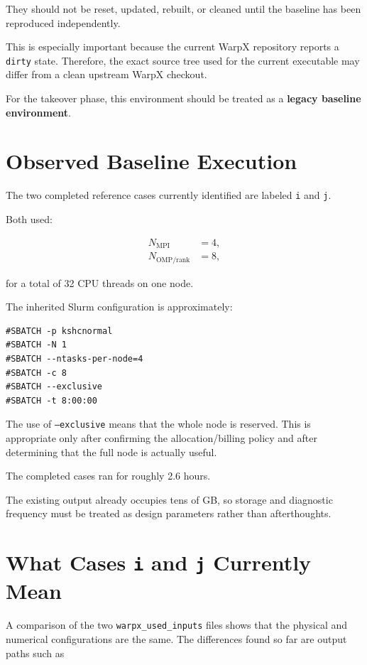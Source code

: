 \documentclass[11pt,a4paper]{article}
\begin{document}
They should not be reset, updated, rebuilt, or cleaned until the baseline has been reproduced independently.

This is especially important because the current WarpX repository reports a \texttt{dirty} state. Therefore, the exact source tree used for the current executable may differ from a clean upstream WarpX checkout.

For the takeover phase, this environment should be treated as a \textbf{legacy baseline environment}.

\section{Observed Baseline Execution}

The two completed reference cases currently identified are labeled \texttt{i} and \texttt{j}.

Both used:

\begin{align*}
N_{\mathrm{MPI}} &= 4,\\
N_{\mathrm{OMP/rank}} &= 8,
\end{align*}

for a total of 32 CPU threads on one node.

The inherited Slurm configuration is approximately:

\begin{lstlisting}
#SBATCH -p kshcnormal
#SBATCH -N 1
#SBATCH --ntasks-per-node=4
#SBATCH -c 8
#SBATCH --exclusive
#SBATCH -t 8:00:00
\end{lstlisting}

The use of \texttt{--exclusive} means that the whole node is reserved. This is appropriate only after confirming the allocation/billing policy and after determining that the full node is actually useful.

The completed cases ran for roughly 2.6 hours.

The existing output already occupies tens of GB, so storage and diagnostic frequency must be treated as design parameters rather than afterthoughts.

\section{What Cases \texttt{i} and \texttt{j} Currently Mean}

A comparison of the two \texttt{warpx\_used\_inputs} files shows that the physical and numerical configurations are the same. The differences found so far are output paths such as
\end{document}
